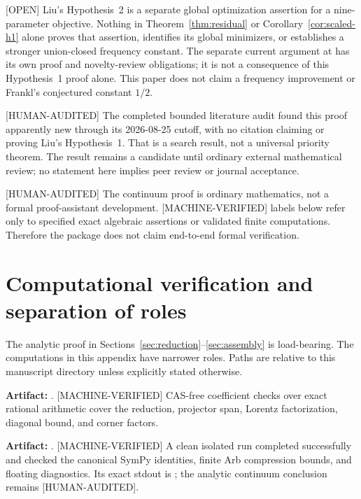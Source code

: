 \documentclass[11pt]{article}
\theoremstyle{plain}
\theoremstyle{definition}
\theoremstyle{remark}
\newcommand{\status}[1]{\textnormal{\textsf{\footnotesize[#1]}}}
\newcommand{\MachineVerified}{\status{MACHINE-VERIFIED}}
\newcommand{\HumanAudited}{\status{HUMAN-AUDITED}}
\newcommand{\OpenStatus}{\status{OPEN}}
\begin{document}
\OpenStatus{} Liu's Hypothesis~2 is a separate global optimization assertion
for a nine-parameter objective.  Nothing in Theorem~\ref{thm:residual} or
Corollary~\ref{cor:scaled-h1} alone proves that assertion, identifies its global
minimizers, or establishes a stronger union-closed frequency constant.
The separate current argument at 
has its own proof and novelty-review obligations; it is not a consequence
of this Hypothesis~1 proof alone.  This paper does not claim a frequency
improvement or Frankl's conjectured constant
\(1/2\).

\HumanAudited{} The completed bounded literature audit found this proof
apparently new through its 2026-08-25 cutoff, with no citation claiming or
proving Liu's Hypothesis~1.  That is a search result, not a universal priority
theorem.  The result remains a candidate until ordinary external mathematical
review; no statement here implies peer review or journal acceptance.

\HumanAudited{} The continuum proof is ordinary mathematics, not a formal
proof-assistant development.  \MachineVerified{} labels below refer only to
specified exact algebraic assertions or validated finite computations.
Therefore the package does not claim end-to-end formal verification.

\appendix
\section{Computational verification and separation of roles}
\label{app:verification}

The analytic proof in Sections~\ref{sec:reduction}--\ref{sec:assembly} is
load-bearing.  The computations in this appendix have narrower roles.  Paths
are relative to this manuscript directory unless explicitly stated otherwise.

\medskip
\noindent\textbf{Artifact:} .
\MachineVerified{} CAS-free coefficient checks over exact rational arithmetic
cover the reduction, projector span, Lorentz factorization, diagonal bound,
and corner factors.

\medskip
\noindent\textbf{Artifact:} .
\MachineVerified{} A clean isolated run completed successfully and checked the
canonical SymPy identities, finite Arb compression bounds, and floating
diagnostics.  Its exact stdout is
; the analytic continuum
conclusion remains \HumanAudited{}.
\end{document}

